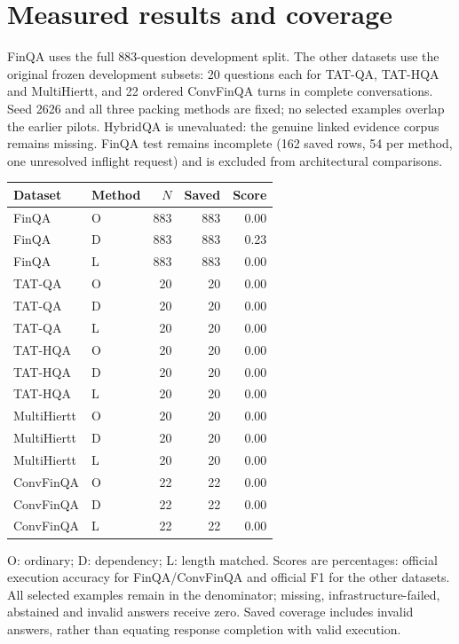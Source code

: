 \section{Measured results and coverage}
FinQA uses the full 883-question development split. The other datasets use the original frozen development subsets: 20 questions each for TAT-QA, TAT-HQA and MultiHiertt, and 22 ordered ConvFinQA turns in complete conversations. Seed 2626 and all three packing methods are fixed; no selected examples overlap the earlier pilots. HybridQA is unevaluated: the genuine linked evidence corpus remains missing.
FinQA test remains incomplete (162 saved rows, 54 per method, one unresolved inflight request) and is excluded from architectural comparisons.
\begin{center}\small\setlength{\tabcolsep}{2pt}\begin{tabular}{llrrr}
Dataset & Method & $N$ & Saved & Score\\\hline
FinQA & O & 883 & 883 & 0.00\\
FinQA & D & 883 & 883 & 0.23\\
FinQA & L & 883 & 883 & 0.00\\
TAT-QA & O & 20 & 20 & 0.00\\
TAT-QA & D & 20 & 20 & 0.00\\
TAT-QA & L & 20 & 20 & 0.00\\
TAT-HQA & O & 20 & 20 & 0.00\\
TAT-HQA & D & 20 & 20 & 0.00\\
TAT-HQA & L & 20 & 20 & 0.00\\
MultiHiertt & O & 20 & 20 & 0.00\\
MultiHiertt & D & 20 & 20 & 0.00\\
MultiHiertt & L & 20 & 20 & 0.00\\
ConvFinQA & O & 22 & 22 & 0.00\\
ConvFinQA & D & 22 & 22 & 0.00\\
ConvFinQA & L & 22 & 22 & 0.00\\
\end{tabular}\end{center}
O: ordinary; D: dependency; L: length matched. Scores are percentages: official execution accuracy for FinQA/ConvFinQA and official F1 for the other datasets. All selected examples remain in the denominator; missing, infrastructure-failed, abstained and invalid answers receive zero. Saved coverage includes invalid answers, rather than equating response completion with valid execution.

